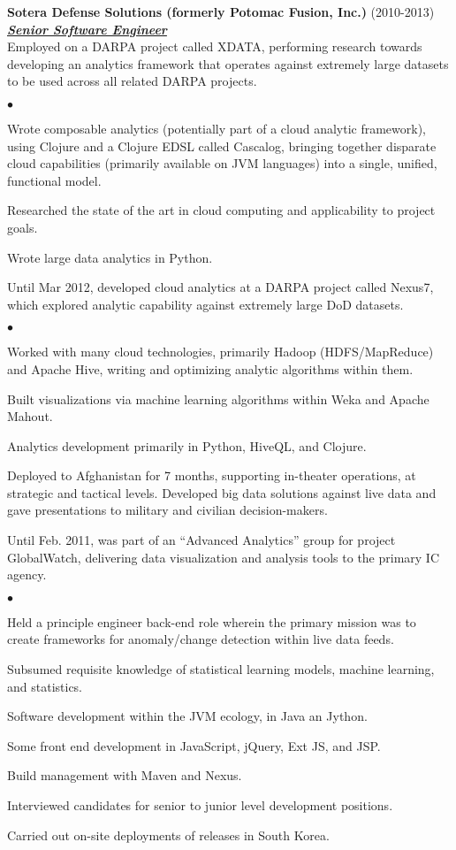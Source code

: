 \documentclass{article}
\newcommand{\employer}[3]{{ \textbf{#1} (#2)\\ \underline{\textbf{\emph{#3}}}\\  }}
\newenvironment{achievements}{\begin{list}{$\bullet$}{\topsep 0pt \itemsep
      -2pt}}{\vspace*{4pt}\end{list}}
\begin{document}
\employer{Sotera Defense Solutions (formerly Potomac Fusion,
  Inc.)}{2010-2013}{Senior Software Engineer} Employed on a DARPA project
called XDATA, performing research towards developing an analytics framework
that operates against extremely large datasets to be used across all related
DARPA projects.
\begin{achievements}
\item Wrote composable analytics (potentially part of a cloud analytic
  framework), using Clojure and a Clojure EDSL called Cascalog, bringing
  together disparate cloud capabilities (primarily available on JVM languages)
  into a single, unified, functional model.
\item Researched the state of the art in cloud computing and applicability to
  project goals.
\item Wrote large data analytics in Python.
\end{achievements}
Until Mar 2012, developed cloud analytics at a DARPA project called Nexus7,
which explored analytic capability against extremely large DoD datasets.
\begin{achievements}
\item Worked with many cloud technologies, primarily Hadoop (HDFS/MapReduce)
  and Apache Hive, writing and optimizing analytic algorithms within them.
\item Built visualizations via machine learning algorithms within Weka and
  Apache Mahout.
\item Analytics development primarily in Python, HiveQL, and Clojure.
\item Deployed to Afghanistan for 7 months, supporting in-theater operations,
  at strategic and tactical levels.  Developed big data solutions against live
  data and gave presentations to military and civilian decision-makers.
\end{achievements}
Until Feb. 2011, was part of an ``Advanced Analytics'' group for project
GlobalWatch, delivering data visualization and analysis tools to the primary IC
agency.
\begin{achievements}
\item Held a principle engineer back-end role wherein the primary mission was
  to create frameworks for anomaly/change detection within live data feeds.
\item Subsumed requisite knowledge of statistical learning models, machine
  learning, and statistics.
\item Software development within the JVM ecology, in Java an Jython.
\item Some front end development in JavaScript, jQuery, Ext JS, and JSP.
\item Build management with Maven and Nexus.
\item Interviewed candidates for senior to junior level development positions.
\item Carried out on-site deployments of releases in South Korea.
\end{achievements}
\end{document}

